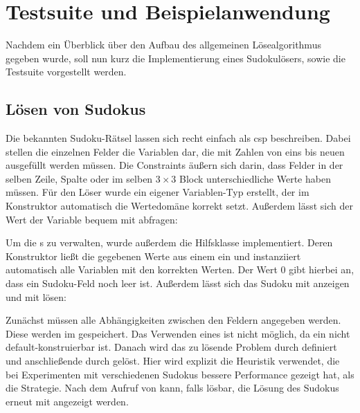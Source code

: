 \section{Testsuite und Beispielanwendung}
Nachdem ein Überblick über den Aufbau des allgemeinen Lösealgorithmus gegeben wurde, soll nun kurz die Implementierung eines Sudokulösers, sowie die Testsuite vorgestellt werden.

\subsection{Lösen von Sudokus}
Die bekannten Sudoku-Rätsel lassen sich recht einfach als \ac*{csp} beschreiben. Dabei stellen die einzelnen Felder die Variablen dar, die mit Zahlen von eins bis neuen ausgefüllt
werden müssen. Die Constraints äußern sich darin, dass Felder in der selben Zeile, Spalte oder im selben $3 \times 3$ Block unterschiedliche Werte haben müssen. Für den Löser wurde
ein eigener Variablen-Typ erstellt, der im Konstruktor automatisch die Wertedomäne korrekt setzt. Außerdem lässt sich der Wert der Variable bequem mit  abfragen:

Um die s zu verwalten, wurde außerdem die Hilfsklasse  implementiert. Deren Konstruktor ließt die gegebenen Werte aus einem 
ein und instanziiert automatisch alle Variablen mit den korrekten Werten. Der Wert 0 gibt hierbei an, dass ein Sudoku-Feld noch leer ist. Außerdem lässt sich das Sudoku mit
 anzeigen und mit  lösen:

Zunächst müssen alle Abhängigkeiten zwischen den Feldern angegeben werden. Diese werden im  gespeichert. Das Verwenden eines  ist
nicht möglich, da ein  nicht default-konstruierbar ist. Danach wird das zu lösende Problem durch  definiert und anschließende durch
 gelöst. Hier wird explizit die Heuristik  verwendet, die bei Experimenten mit verschiedenen Sudokus bessere Performance gezeigt
hat, als die  Strategie. Nach dem Aufruf von  kann, falls lösbar, die Lösung des Sudokus erneut mit  angezeigt werden.

